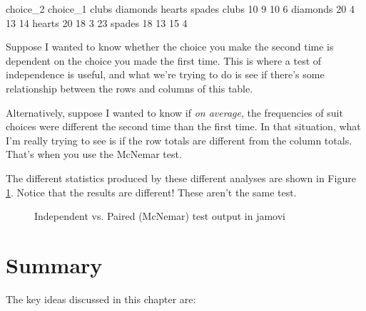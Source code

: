 \vspace{1.0cm}
\begin{rblock1}
          choice_2
choice_1   clubs diamonds hearts spades
  clubs       10        9     10      6
  diamonds    20        4     13     14
  hearts      20       18      3     23
  spades      18       13     15      4
\end{rblock1}

Suppose I wanted to know whether the choice you make the second time is dependent on the choice you made the first time. This is where a test of independence is useful, and what we're trying to do is see if there's some relationship between the rows and columns of this table. 

Alternatively, suppose I wanted to know if {\it on average}, the frequencies of suit choices were different the second time than the first time. In that situation, what I'm really trying to see is if the row totals are different from the column totals. That's when you use the McNemar test.

The different statistics produced by these different analyses are shown in Figure \ref{fig:ind_paired}. 
Notice that the results are different! These aren't the same test. 

\begin{figure}[p]
\begin{center}
\caption{Independent vs. Paired (McNemar) test output in jamovi}
\label{fig:ind_paired}
\HR
\end{center}
\end{figure}

\vspace{15cm}
\section{Summary}

The key ideas discussed in this chapter are:

